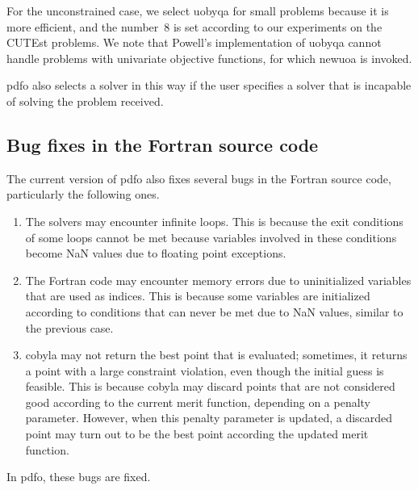 \documentclass[
    smallextended,  %
    final,        %
]{svjour3}
\begin{document}
For the unconstrained case, we select \gls{uobyqa} for small problems because it is more efficient, and the number~$8$ is set according to our experiments on the CUTEst problems.
We note that Powell's implementation of \gls{uobyqa} cannot handle problems with univariate objective functions, for which \gls{newuoa} is invoked.

\gls{pdfo} also selects a solver in this way if the user specifies a solver that is incapable of
solving the problem received.

\subsection{Bug fixes in the Fortran source code}
\label{subsec:bug-corrections}

The current version of \gls{pdfo} also fixes several bugs in the Fortran source code, particularly the following ones.
\begin{enumerate}
    \item The solvers may encounter infinite loops.
    This is because the exit conditions of some loops cannot be met because variables involved in these conditions become NaN values due to floating point exceptions.
    \item The Fortran code may encounter memory errors due to uninitialized variables that are used as indices.
    This is because some variables are initialized according to conditions that can never be met due to NaN values, similar to the previous case.
    \item \Gls{cobyla} may not return the best point that is evaluated; sometimes, it returns a point with a large constraint violation, even though the initial guess is feasible.
    This is because \gls{cobyla} may discard points that are not considered good according to the current merit function, depending on a penalty parameter.
    However, when this penalty parameter is updated, a discarded point may turn out to be the best point according the updated merit function.
\end{enumerate}
In \gls{pdfo}, these bugs are fixed.
\end{document}
